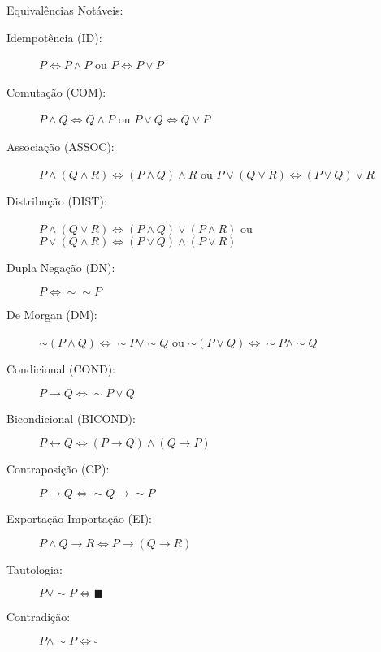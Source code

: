 \documentclass[12pt]{article}
\begin{document}
Equivalências Notáveis:
\begin{description}
\item[Idempotência (ID):] $P\Leftrightarrow P\wedge P$ ou $P\Leftrightarrow P\vee P$
\item[Comutação (COM):] $P\wedge Q\Leftrightarrow Q\wedge P$ ou $P\vee Q\Leftrightarrow Q\vee P$
\item[Associação (ASSOC):] $P\wedge(Q\wedge R)\Leftrightarrow (P\wedge Q)\wedge R$ ou $P\vee(Q\vee R)\Leftrightarrow (P\vee Q)\vee R$ 
\item[Distribução (DIST):] $P\wedge(Q\vee R)\Leftrightarrow (P\wedge Q)\vee (P \wedge R)$ ou $P\vee(Q\wedge R)\Leftrightarrow (P\vee Q)\wedge (P\vee R)$
\item[Dupla Negação (DN):] $P\Leftrightarrow\sim\sim P$
\item[De Morgan (DM):] $\sim(P \wedge Q) \Leftrightarrow \sim P \vee\sim Q$ ou $\sim(P \vee Q) \Leftrightarrow \sim P \wedge\sim Q$
\item[Condicional (COND):] $P\rightarrow Q \Leftrightarrow\sim P \vee Q$

\item[Bicondicional (BICOND):] $P\leftrightarrow Q \Leftrightarrow (P\rightarrow Q)\wedge(Q\rightarrow P)$

\item[Contraposição (CP):] $P\rightarrow Q \Leftrightarrow \sim Q\rightarrow\sim P$

\item[Exportação-Importação (EI):] $P\wedge Q\rightarrow R \Leftrightarrow P\rightarrow(Q\rightarrow R)$

\item[Tautologia:] $P\vee \sim P \Leftrightarrow \blacksquare  $

\item[Contradição:] $ P\wedge \sim P \Leftrightarrow \square  $


\end{description}
%
\end{document}

